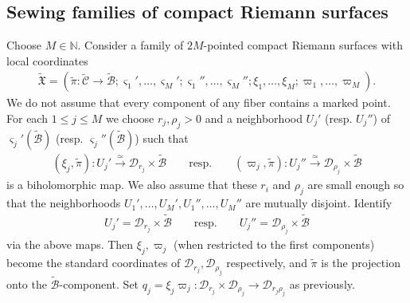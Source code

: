 \documentclass[12pt,a4paper,notitlepage]{report}
\theoremstyle{definition}
\theoremstyle{plain}
\newcommand{\fk}{\mathfrak}
\newcommand{\mc}{\mathcal}
\newcommand{\wtd}{\widetilde}
\newcommand{\sgm}{\varsigma}
\numberwithin{equation}{section}
\begin{document}





\subsection*{Sewing families of compact Riemann surfaces}

Choose $M\in\mathbb N$. Consider a family of $2M$-pointed compact Riemann surfaces with local coordinates
\begin{align}
\wtd{\fk X}=(\wtd\pi:\wtd{\mc C}\rightarrow\wtd{\mc B};\sgm_1',\dots,\sgm_M';\sgm_1'',\dots,\sgm_M'';\xi_1,\dots,\xi_M;\varpi_1,\dots,\varpi_M).\label{eq61}
\end{align}
We do not assume that every component of any fiber contains a marked point. For each $1\leq j\leq M$ we choose $r_j,\rho_j>0$ and a neighborhood $U_j'$ (resp. $U_j''$) of $\sgm_j'(\wtd {\mc B})$ (resp. $\sgm_j''(\wtd {\mc B})$) such that
\begin{gather}
(\xi_j,\wtd\pi):U_j'\xrightarrow{\simeq} \mc D_{r_j}\times\wtd{\mc B}\qquad\text{resp.}\qquad (\varpi_j,\wtd\pi):U_j''\xrightarrow{\simeq} \mc D_{\rho_j}\times\wtd{\mc B}\label{eq113}
\end{gather}
is a biholomorphic map. We also assume that these $r_i$ and $\rho_j$ are small enough so that the neighborhoods $U_1',\dots,U_M',U_1'',\dots,U_M''$ are mutually disjoint. Identify
\begin{gather*}
U_j'=\mc D_{r_j}\times\wtd{\mc B}\qquad\text{resp.}\qquad U_j''=\mc D_{\rho_j}\times\wtd{\mc B}
\end{gather*}
via the above maps. Then $\xi_j,\varpi_j$ (when restricted to the first components) become the standard coordinates of $\mc D_{r_j},\mc D_{\rho_j}$ respectively, and $\wtd\pi$ is the projection onto the $\wtd{\mc B}$-component. Set $q_j=\xi_j\varpi_j:\mc D_{r_j}\times\mc D_{\rho_j}\rightarrow\mc D_{r_j\rho_j}$ as previously.  
\end{document}

